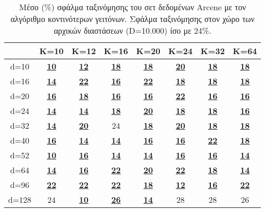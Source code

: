 \begin{table}[H]
\singlespacing
\centering
\label{tab:table19}
\caption{Μέσο (\%) σφάλμα ταξινόμησης του σετ δεδομένων \textlatin{Arcene} με τον αλγόριθμο κοντινότερων γειτόνων. Σφάλμα ταξινόμησης στον χώρο των αρχικών διαστάσεων \textlatin{(D=10.000)} ίσο με 24\%. }
\vspace*{5mm}
\begin{tabular}{|c|c|c|c|c|c|c|c|}
\hline
 & K=10 & K=12 & K=16 & K=20 & K=24 & K=32 & K=64 \\
\hline
\textlatin{d}=10 & \underline{\textbf{10}} & \underline{\textbf{12}} & \underline{\textbf{18}} & \underline{\textbf{18}} & \underline{\textbf{20}} & \underline{\textbf{18}} & \underline{\textbf{18}} \\
\textlatin{d}=16 & \underline{\textbf{14}} & \underline{\textbf{22}} & \underline{\textbf{16}} & \underline{\textbf{22}} & \underline{\textbf{18}} & \underline{\textbf{18}} & \underline{\textbf{18}} \\
\textlatin{d=20} & \underline{\textbf{16}} & \underline{\textbf{18}} & \underline{\textbf{16}} & \underline{\textbf{16}} & \underline{\textbf{22}} & \underline{\textbf{16}} & \underline{\textbf{16}} \\
\textlatin{d}=24 & \underline{\textbf{14}} & \underline{\textbf{14}} & \underline{\textbf{18}} & \underline{\textbf{20}} & \underline{\textbf{18}} & \underline{\textbf{18}} & \underline{\textbf{16}} \\
\textlatin{d}=32 & \underline{\textbf{14}} & \underline{\textbf{20}} & 24 & \underline{\textbf{18}} & \underline{\textbf{20}} & \underline{\textbf{18}} & \underline{\textbf{18}} \\
\textlatin{d}=40 & \underline{\textbf{16}} & \underline{\textbf{14}} & \underline{\textbf{14}} & \underline{\textbf{16}} & \underline{\textbf{16}} & \underline{\textbf{22}} & \underline{\textbf{18}} \\
\textlatin{d}=52 & \underline{\textbf{10}} & \underline{\textbf{16}} & \underline{\textbf{14}} & \underline{\textbf{14}} & \underline{\textbf{16}} & \underline{\textbf{16}} & \underline{\textbf{14}} \\
\textlatin{d}=64 & \underline{\textbf{14}} & \underline{\textbf{16}} & \underline{\textbf{22}} & \underline{\textbf{20}} & \underline{\textbf{22}} & \underline{\textbf{18}} & \underline{\textbf{14}} \\
\textlatin{d}=96 & \underline{\textbf{22}} & \underline{\textbf{22}} & \underline{\textbf{22}} & \underline{\textbf{18}} & \underline{\textbf{12}} & \underline{\textbf{16}} & \underline{\textbf{22}} \\
\textlatin{d}=128 & 24 & \underline{\textbf{10}} & \underline{\textbf{26}} & \underline{\textbf{14}} & 28 & 28 & 26 \\
\hline
\end{tabular}
\end{table}

